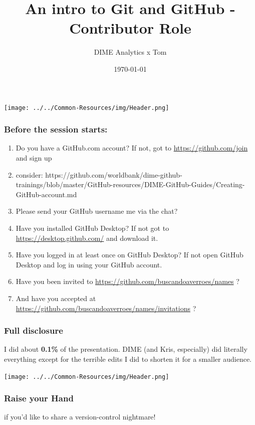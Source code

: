 \documentclass[aspectratio=169]{beamer} %
\title{An intro to Git and GitHub - Contributor Role}
\author{DIME Analytics x Tom}
\institute{DIME - The World Bank - \trainingURL{https://www.worldbank.org/en/research/dime}}
\date{\today}
\newcommand{\trainingURL}[1]{{\color{blue}\url{#1}}}
\newcommand{\traininerUsername}{buscandoaverroes}
\newcommand{\repoName}{\traininerUsername/names}
\newcommand{\trainingRepoURL}[1]{\trainingURL{https://github.com/\repoName #1}}
\begin{document}
\begin{frame}
\texttt{[image: ../../Common-Resources/img/Header.png]}
\vspace{-0.2cm}
\titlepage 	 %
\end{frame}

\begin{frame}
\frametitle{Before the session starts:}
	\begin{enumerate}
		\item Do you have a GitHub.com account? If not, got to \trainingURL{https://github.com/join} and sign up
		\item consider: https://github.com/worldbank/dime-github-trainings/blob/master/GitHub-resources/DIME-GitHub-Guides/Creating-GitHub-account.md
		\item Please send your GitHub username me via the chat?
		\item Have you installed GitHub Desktop? If not got to \trainingURL{https://desktop.github.com/} and download it.
		\item Have you logged in at least once on GitHub Desktop? If not open GitHub Desktop and log in using your GitHub account.
		\item Have you been invited to \trainingRepoURL{} ?
		\item And have you accepted at \trainingRepoURL{/invitations} ?
	\end{enumerate}

\end{frame}

\begin{frame}
\frametitle{Full disclosure}

	I did about \textbf{0.1\%} of the presentation. DIME (and Kris, especially) did literally everything
	except for the terrible edits I did to shorten it for a smaller audience.


\end{frame}


\begin{frame}
\texttt{[image: ../../Common-Resources/img/Header.png]}
\vspace{-0.2cm}
\titlepage 	 %
\end{frame}

\begin{frame}
	\frametitle{Raise your Hand}

	\small if you'd like to share a version-control nightmare!

\end{frame}
\end{document}
